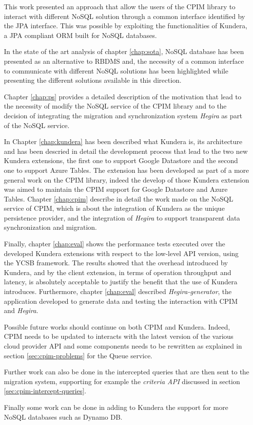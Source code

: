 This work presented an approach that allow the users of the CPIM library to interact with different NoSQL solution through a common interface identified by the JPA interface. This was possible by exploiting the functionalities of Kundera, a JPA compliant ORM built for NoSQL databases.

\noindent In the state of the art analysis of chapter \ref{chap:sota}, NoSQL database has been presented as an alternative to RBDMS and, the necessity of a common interface to communicate with different NoSQL solutions has been highlighted while presenting the different solutions available in this direction.

\noindent Chapter \ref{chap:ps} provides a detailed description of the motivation that lead to the necessity of modify the NoSQL service of the CPIM library and to the decision of integrating the migration and synchronization system \textit{Hegira} as part of the NoSQL service.

\noindent In Chapter \ref{chap:kundera} has been described what Kundera is, its architecture and has been descried in detail the development process that lead to the two new Kundera extensions, the first one to support Google Datastore and the second one to support Azure Tables. The extension has been developed as part of a more general work on the CPIM library, indeed the develop of those Kundera extension was aimed to maintain the CPIM support for Google Datastore and Azure Tables. Chapter \ref{chap:cpim} describe in detail the work made on the NoSQL service of CPIM, which is about the integration of Kundera as the unique persistence provider, and the integration of \textit{Hegira} to support transparent data synchronization and migration.

\noindent Finally, chapter \ref{chap:eval} shows the performance tests executed over the developed Kundera extensions with respect to the low-level API version, using the YCSB framework. The results showed that the overhead introduced by Kundera, and by the client extension, in terms of operation throughput and latency, is absolutely acceptable to justify the benefit that the use of Kundera introduces.
Furthermore, chapter \ref{chap:eval} described \textit{Hegira-generator}, the application developed to generate data and testing the interaction with CPIM and \textit{Hegira}.

\newparagraph Possible future works should continue on both CPIM and Kundera. Indeed, CPIM needs to be updated to interacts with the latest version of the various cloud provider API and some components needs to be rewritten as explained in section \ref{sec:cpim-problems} for the Queue service.

\noindent Further work can also be done in the intercepted queries that are then sent to the migration system, supporting for example the \textit{criteria API} discussed in section \ref{sec:cpim-intercept-queries}.

\noindent Finally some work can be done in adding to Kundera the support for more NoSQL databases such as Dynamo DB.
